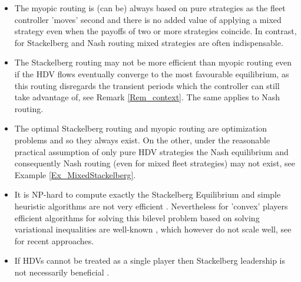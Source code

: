 \documentclass[a4paper,11pt]{article}
\begin{document}
\begin{itemize}
\item The myopic routing is (can be) always based on pure strategies as the fleet controller 'moves' second and there is no added value of applying a mixed strategy even when the payoffs of two or more strategies coincide. In contrast, for Stackelberg and Nash routing mixed strategies are often indispensable. 
 

\item The Stackelberg routing may not be more efficient than myopic routing even if the HDV flows eventually converge to the most favourable equilibrium, as this routing disregards the transient periods which the controller can still take advantage of, see Remark \ref{Rem_context}. The same applies to Nash routing. 

\item The optimal Stackelberg routing and myopic routing are optimization problems and so they always exist. On the other, under the reasonable practical assumption of only pure HDV strategies the Nash equilibrium and consequently Nash routing (even for mixed fleet strategies) may not exist, see Example \ref{Ex_MixedStackelberg}. 

\item It is NP-hard to compute exactly the Stackelberg Equilibrium and simple heuristic algorithms are not very efficient \cite{Jeroslow, StackelbergRoughgarden}.  Nevertheless for 'convex' players efficient algorithms for solving this bilevel problem based on solving variational inequalities are well-known \cite{Yang2007, VanVuren}, which however do not scale well, see \cite{LiBilevel} for recent approaches.  
\item If HDVs cannot be treated as a single player then Stackelberg leadership is not necessarily beneficial \cite{VonStengel}. 
\end{itemize}
\end{document}
